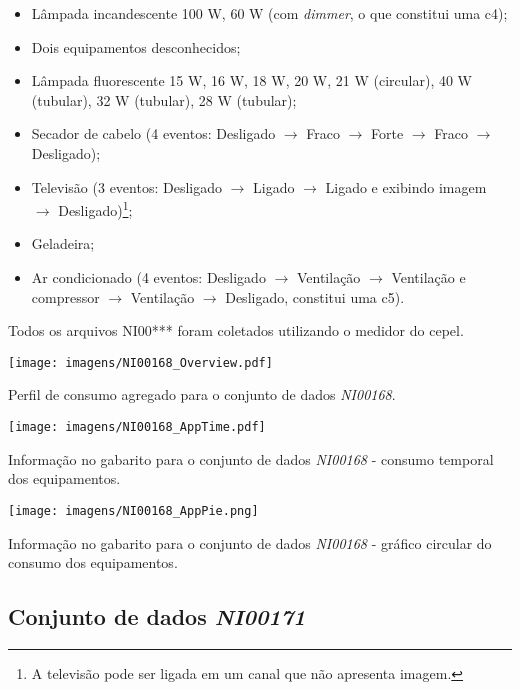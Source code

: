 \begin{itemize}
\item Lâmpada incandescente 100 W, 60 W (com \emph{dimmer},
o que constitui uma \acs{c4});
\item Dois equipamentos desconhecidos;
\item Lâmpada fluorescente 15 W, 16 W, 18 W, 20 W, 21 W (circular),
40 W (tubular), 32 W (tubular), 28 W (tubular);
\item Secador de cabelo (4 eventos: Desligado $\rightarrow$ Fraco
$\rightarrow$ Forte $\rightarrow$ Fraco $\rightarrow$ Desligado);
\item Televisão (3 eventos: Desligado $\rightarrow$ Ligado
$\rightarrow$ Ligado e exibindo imagem $\rightarrow$
Desligado)\footnote{A televisão pode ser ligada em um canal que não
apresenta imagem.};
\item Geladeira;
\item Ar condicionado (4 eventos: Desligado $\rightarrow$ Ventilação
$\rightarrow$ Ventilação e compressor $\rightarrow$ Ventilação
$\rightarrow$ Desligado, constitui uma \acs{c5}).
\end{itemize}

Todos os arquivos NI00*** foram coletados utilizando o medidor do
\acs{cepel}.

\begin{SidewaysFigure}
\centering
\texttt{[image: imagens/NI00168\_Overview.pdf]}
\caption{Perfil de consumo agregado para o conjunto de dados
\emph{NI00168}.}
\label{fig:ni00168_overview}
\end{SidewaysFigure}

\begin{SidewaysFigure}
\centering
\texttt{[image: imagens/NI00168\_AppTime.pdf]}
\caption{Informação no gabarito para o conjunto de dados
\emph{NI00168} - consumo temporal dos equipamentos.}
\label{fig:ni00168_app_time}
\end{SidewaysFigure}

\begin{SidewaysFigure}
\centering
\texttt{[image: imagens/NI00168\_AppPie.png]}
\caption{Informação no gabarito para o conjunto de dados
\emph{NI00168} - gráfico circular do consumo dos equipamentos.}
\label{fig:ni00168_app_pie}
\end{SidewaysFigure}

\FloatBarrier
\subsection{Conjunto de dados \emph{NI00171}}

